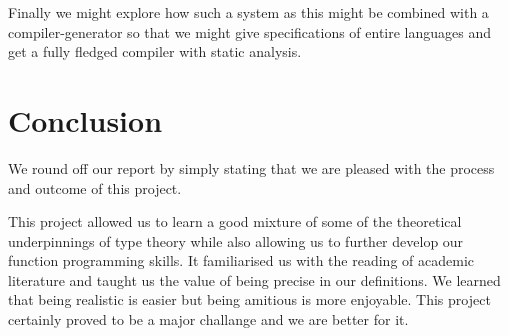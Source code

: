 Finally we might explore how such a system as this might be combined
with a compiler-generator so that we might give specifications of
entire languages and get a fully fledged compiler with static
analysis.

\section{Conclusion}

We round off our report by simply stating that we are pleased with the
process and outcome of this project.

This project allowed us to learn a good mixture of some of the
theoretical underpinnings of type theory while also allowing us to
further develop our function programming skills. It familiarised us
with the reading of academic literature and taught us the value of
being precise in our definitions. We learned that being realistic is
easier but being amitious is more enjoyable. This project certainly
proved to be a major challange and we are better for it.
